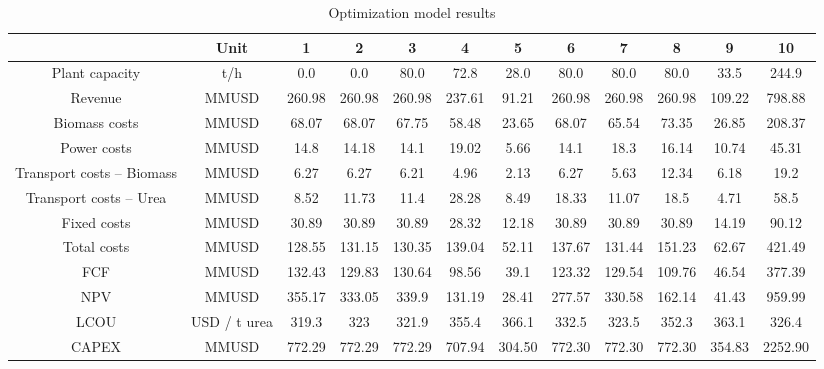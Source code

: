 \documentclass[a4paper, titlepage]{article}
\begin{document}
\begin{table}
    \caption{Optimization model results}
    \label{tab_optimizationresults}
    \begin{tabular}{|| c | c | c | c  | c | c | c | c | c | c | c | c ||}
        \hline
                                  & Unit         & 1      & 2      & 3      & 4      & 5      & 6      & 7      & 8      & 9      & 10      \\
        \hline
        Plant capacity            & t/h          & 0.0    & 0.0    & 80.0   & 72.8   & 28.0   & 80.0   & 80.0   & 80.0   & 33.5   & 244.9   \\
        Revenue                   & MMUSD        & 260.98 & 260.98 & 260.98 & 237.61 & 91.21  & 260.98 & 260.98 & 260.98 & 109.22 & 798.88  \\
        Biomass costs             & MMUSD        & 68.07  & 68.07  & 67.75  & 58.48  & 23.65  & 68.07  & 65.54  & 73.35  & 26.85  & 208.37  \\
        Power costs               & MMUSD        & 14.8   & 14.18  & 14.1   & 19.02  & 5.66   & 14.1   & 18.3   & 16.14  & 10.74  & 45.31   \\
        Transport costs – Biomass & MMUSD        & 6.27   & 6.27   & 6.21   & 4.96   & 2.13   & 6.27   & 5.63   & 12.34  & 6.18   & 19.2    \\
        Transport costs – Urea    & MMUSD        & 8.52   & 11.73  & 11.4   & 28.28  & 8.49   & 18.33  & 11.07  & 18.5   & 4.71   & 58.5    \\
        Fixed costs               & MMUSD        & 30.89  & 30.89  & 30.89  & 28.32  & 12.18  & 30.89  & 30.89  & 30.89  & 14.19  & 90.12   \\
        Total costs               & MMUSD        & 128.55 & 131.15 & 130.35 & 139.04 & 52.11  & 137.67 & 131.44 & 151.23 & 62.67  & 421.49  \\
        FCF                       & MMUSD        & 132.43 & 129.83 & 130.64 & 98.56  & 39.1   & 123.32 & 129.54 & 109.76 & 46.54  & 377.39  \\
        NPV                       & MMUSD        & 355.17 & 333.05 & 339.9  & 131.19 & 28.41  & 277.57 & 330.58 & 162.14 & 41.43  & 959.99  \\
        LCOU                      & USD / t urea & 319.3  & 323    & 321.9  & 355.4  & 366.1  & 332.5  & 323.5  & 352.3  & 363.1  & 326.4   \\
        CAPEX                     & MMUSD        & 772.29 & 772.29 & 772.29 & 707.94 & 304.50 & 772.30 & 772.30 & 772.30 & 354.83 & 2252.90 \\
        \hline
    \end{tabular}

\end{table}
\end{document}
